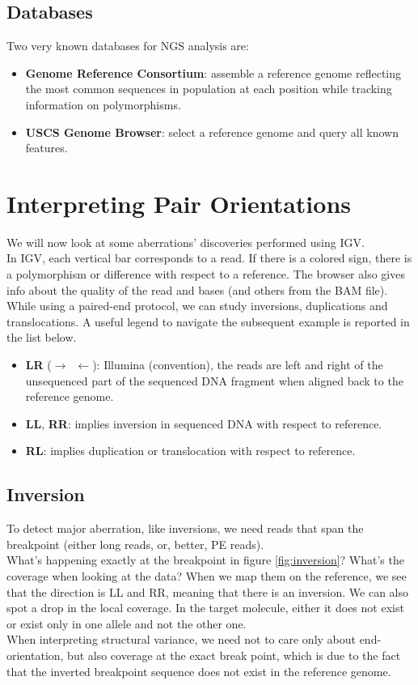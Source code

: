 \subsection{Databases}
Two very known databases for NGS analysis are:
\begin{itemize}
\item \textbf{Genome Reference Consortium}: assemble a reference genome reflecting the most common sequences in population at each position while tracking information on polymorphisms.
\item \textbf{USCS Genome Browser}: select a reference genome and query all known features.
\end{itemize}

\section{Interpreting Pair Orientations}
We will now look at some aberrations' discoveries performed using IGV.\\
In IGV, each vertical bar corresponds to a read.
If there is a colored sign, there is a polymorphism or difference with respect to a reference.
The browser also gives info about the quality of the read and bases (and others from the BAM file).\\
While using a paired-end protocol, we can study inversions, duplications and translocations. A useful legend to navigate the subsequent example is reported in the list below.
\begin{itemize}
\item \textbf{LR} ($\rightarrow \, \, \, \leftarrow$): Illumina (convention), the reads are left and right of the unsequenced part of the sequenced DNA fragment when aligned back to the reference genome.
\item \textbf{LL}, \textbf{RR}: implies inversion in sequenced DNA with respect to reference.
\item \textbf{RL}: implies duplication or translocation with respect to reference.

\end{itemize}

\subsection{Inversion}
To detect major aberration, like inversions, we need reads that span the breakpoint (either long reads, or, better, PE reads). \\
What's happening exactly at the breakpoint in figure \ref{fig:inversion}? What's the coverage when looking at the data?  When we map them on the reference, we see that the direction is LL and RR, meaning that there is an inversion.
We can also spot a drop in the local coverage.
In the target molecule, either it does not exist or exist only in one allele and not the other one. \\
When interpreting structural variance, we need not to care only about end-orientation, but also coverage at the exact break point, which is due to the fact that the inverted breakpoint sequence does not exist in the reference genome.



